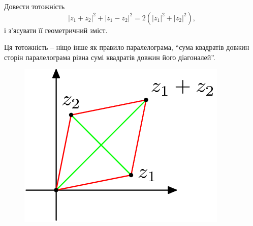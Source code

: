 \begin{problem}
	Довести тотожність \[|z_1+z_2|^2+|z_1-z_2|^2=2(|z_1|^2+|z_2|^2),\] і з'ясувати її геометричний зміст.
\end{problem}
\begin{solution}
	Ця тотожність -- ніщо інше як правило паралелограма, ``сума квадратів довжин сторін паралелограма рівна сумі квадратів довжин його діагоналей''.
	\begin{figure}[H]
		\centering
		\includegraphics[width=.45\linewidth]{fig-3.png}
	\end{figure}
\end{solution}

